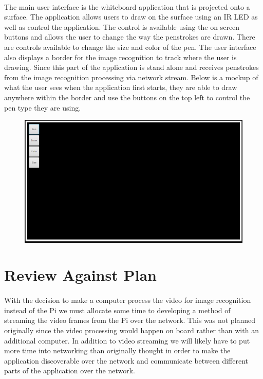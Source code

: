 \documentclass[12pt]{article}
\begin{document}
\paragraph{} 
The main user interface is the whiteboard application that is projected onto a surface. 
The application allows users to draw on the surface using an IR LED as well as control the application. 
The control is available using the on screen buttons and allows the user to change the way the penstrokes are drawn. 
There are controls available to change the size and color of the pen. 
The user interface also displays a border for the image recognition to track where the user is drawing. 
Since this part of the application is stand alone and receives penstrokes from the image recognition processing via network stream.
Below is a mockup of what the user sees when the application first starts, they are able to draw anywhere within the border and use the buttons on the top left to control the pen type they are using. 
\begin{figure}[H]
\centering
\includegraphics[scale=.25]{mockup.png}
\end{figure}

\section{Review Against Plan}
\paragraph{}
With the decision to make a computer process the video for image recognition instead of the Pi we must allocate some time to developing a method of streaming the video frames from the Pi over the network.
This was not planned originally since the video processing would happen on board rather than with an additional computer. 
In addition to video streaming we will likely have to put more time into networking than originally thought in order to make the application discoverable over the network and communicate between different parts of the application over the network. 

\end{document}
